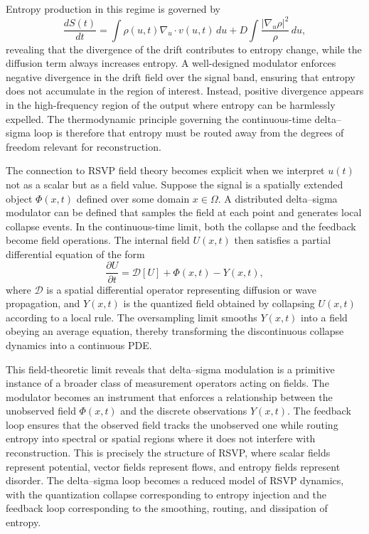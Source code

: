 Entropy production in this regime is governed by
\[
\frac{d S(t)}{dt} = \int \rho(u,t) \nabla_u \cdot v(u,t) \, du + D \int \frac{|\nabla_u \rho|^2}{\rho} \, du,
\]
revealing that the divergence of the drift contributes to entropy change, while the diffusion term always increases entropy. A well-designed modulator enforces negative divergence in the drift field over the signal band, ensuring that entropy does not accumulate in the region of interest. Instead, positive divergence appears in the high-frequency region of the output where entropy can be harmlessly expelled. The thermodynamic principle governing the continuous-time delta–sigma loop is therefore that entropy must be routed away from the degrees of freedom relevant for reconstruction.

The connection to RSVP field theory becomes explicit when we interpret \(u(t)\) not as a scalar but as a field value. Suppose the signal is a spatially extended object \(\Phi(x,t)\) defined over some domain \(x \in \Omega\). A distributed delta–sigma modulator can be defined that samples the field at each point and generates local collapse events. In the continuous-time limit, both the collapse and the feedback become field operations. The internal field \(U(x,t)\) then satisfies a partial differential equation of the form
\[
\frac{\partial U}{\partial t} = \mathcal{D}[U] + \Phi(x,t) - Y(x,t),
\]
where \(\mathcal{D}\) is a spatial differential operator representing diffusion or wave propagation, and \(Y(x,t)\) is the quantized field obtained by collapsing \(U(x,t)\) according to a local rule. The oversampling limit smooths \(Y(x,t)\) into a field obeying an average equation, thereby transforming the discontinuous collapse dynamics into a continuous PDE.

This field-theoretic limit reveals that delta–sigma modulation is a primitive instance of a broader class of measurement operators acting on fields. The modulator becomes an instrument that enforces a relationship between the unobserved field \(\Phi(x,t)\) and the discrete observations \(Y(x,t)\). The feedback loop ensures that the observed field tracks the unobserved one while routing entropy into spectral or spatial regions where it does not interfere with reconstruction. This is precisely the structure of RSVP, where scalar fields represent potential, vector fields represent flows, and entropy fields represent disorder. The delta–sigma loop becomes a reduced model of RSVP dynamics, with the quantization collapse corresponding to entropy injection and the feedback loop corresponding to the smoothing, routing, and dissipation of entropy.

